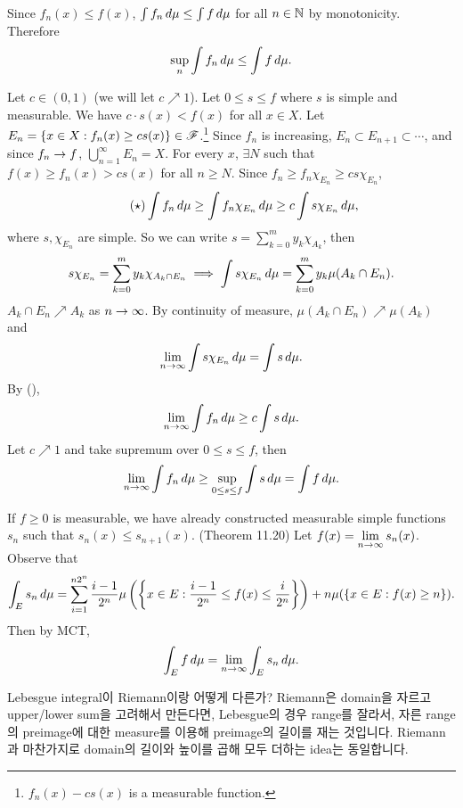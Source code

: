\pf \\
\note{\(\geq\)} Since \(f_n(x) \leq f(x)\), \(\int f_n \,d{\mu} \leq \int f \,d{\mu}\) for all \(n\in \mathbb{N}\) by monotonicity. Therefore
\[
    \sup_n \int f_n \,d{\mu} \leq \int f \,d{\mu}.
\]

\note{\(\leq\)} Let \(c \in (0, 1)\) (we will let \(c \nearrow 1\)). Let \(0 \leq s \leq f\) where \(s\) is simple and measurable. We have \(c \cdot s(x) < f(x)\) for all \(x \in X\). Let \(E_n = \{x \in X : f_n(x) \geq cs(x)\} \in \mathscr{F}\).\footnote{\(f_n(x) - cs(x)\) is a measurable function.} Since \(f_n\) is increasing, \(E_n\subset E_{n+1} \subset \cdots\), and since \(f_n \rightarrow f\), \(\bigcup_{n=1}^\infty E_n = X\). For every \(x\), \(\exists N\) such that \(f(x) \geq f_n(x) > cs(x)\) for all \(n \geq N\). Since \(f_n \geq f_n \chi_{E_n} \geq cs \chi_{E_n}\),
\[ \tag{\mstar}
    \int f_n \d{\mu} \geq \int f_n \chi_{E_n} \d{\mu} \geq c\int s \chi_{E_n} \d{\mu},
\]
where \(s, \chi_{E_n}\) are simple. So we can write \(s = \sum_{k=0}^m y_k \chi_{A_k}\), then
\[
    s\chi_{E_n} = \sum_{k=0}^m y_k \chi_{A_k\cap E_n} \implies \int s \chi_{E_n} \,d{\mu} = \sum_{k=0}^m y_k \mu(A_k\cap E_n).
\]
\(A_k\cap E_n \nearrow A_k\) as \(n\rightarrow\infty\). By continuity of measure, \(\mu(A_k \cap E_n) \nearrow \mu(A_k)\) and
\[
    \lim_{n\rightarrow\infty} \int s \chi_{E_n}\,d{\mu} = \int s \,d{\mu}.
\]
By (\mstar),
\[
    \lim_{n\rightarrow\infty} \int f_n \,d{\mu} \geq c\int s \,d{\mu}.
\]
Let \(c \nearrow 1\) and take supremum over \(0\leq s\leq f\), then
\[
    \lim_{n\rightarrow\infty} \int f_n \,d{\mu} \geq \sup_{0\leq s\leq f} \int s \,d{\mu} = \int f \,d{\mu}.
\]

\pagebreak

\rmk If \(f \geq 0\) is measurable, we have already constructed measurable simple functions \(s_n\) such that \(s_n(x) \leq s_{n+1}(x)\). ({\sffamily Theorem 11.20}) Let \(f(x) = \displaystyle \lim_{n\rightarrow\infty} s_n(x)\). Observe that
\[
    \int_E s_n \,d{\mu} = \sum_{i=1}^{n2^n} \frac{i - 1}{2^n}\mu\left( \left\{x \in E : \frac{i-1}{2^n} \leq f(x) \leq \frac{i}{2^n}\right\} \right) + n\mu(\{x \in E : f(x)\geq n\}).
\]
Then by MCT,
\[
    \int_E f \,d{\mu} = \lim_{n\rightarrow\infty} \int_E s_n \,d{\mu}.
\]

\bigskip

Lebesgue integral이 Riemann이랑 어떻게 다른가? Riemann은 domain을 자르고 upper/lower sum을 고려해서 만든다면, Lebesgue의 경우 range를 잘라서, 자른 range의 preimage에 대한 measure를 이용해 preimage의 길이를 재는 것입니다. Riemann과 마찬가지로 domain의 길이와 높이를 곱해 모두 더하는 idea는 동일합니다.

